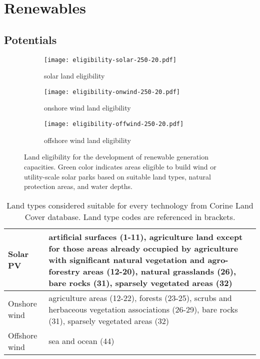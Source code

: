 
\section{Renewables}
\label{sec:si:renewables}

\subsection{Potentials}
\label{sec:si:renewable-potentials}


\begin{figure}
    \centering
    \begin{subfigure}[t]{0.48\textwidth}
            \centering
        \caption{solar land eligibility}
        \texttt{[image: eligibility-solar-250-20.pdf]}
    \end{subfigure}
    \begin{subfigure}[t]{0.48\textwidth}
        \centering
        \caption{onshore wind land eligibility}
        \texttt{[image: eligibility-onwind-250-20.pdf]}
    \end{subfigure}
    \begin{subfigure}[t]{0.48\textwidth}
        \centering
        \vspace{.5cm}
        \caption{offshore wind land eligibility}
        \texttt{[image: eligibility-offwind-250-20.pdf]}
    \end{subfigure}
    \caption{Land eligibility for the development of renewable generation capacities. Green color indicates
    areas eligible to build wind or utility-scale solar parks based on suitable land types, natural protection areas, and water depths.}
    \label{fig:eligibility}
\end{figure}


\begin{table}
    \caption{Land types considered suitable for every technology from Corine Land Cover database. Land type codes are referenced in brackets.}
    \small
    \begin{tabularx}{\textwidth}{lX}
        \toprule
        Solar PV & artificial surfaces (1-11), agriculture land except for those
        areas already occupied by agriculture with significant natural
        vegetation and agro-forestry areas (12-20), natural grasslands (26), bare rocks (31),
        sparsely vegetated areas (32) \\ \midrule
        Onshore wind & agriculture areas (12-22), forests (23-25), scrubs and herbaceous vegetation associations (26-29), bare rocks (31), sparsely vegetated areas (32) \\ \midrule
        Offshore wind & sea and ocean (44) \\ \bottomrule
    \end{tabularx}
    \label{tab:eligibility}
\end{table}

